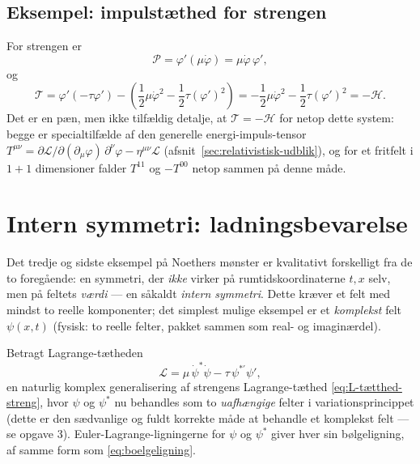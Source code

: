 \subsection{Eksempel: impulstæthed for strengen}

\begin{eksempel}
For strengen er
\begin{equation}
  \mathcal{P} = \varphi'(\mu\dot\varphi) = \mu\dot\varphi\,\varphi',
\end{equation}
og
\begin{equation}
  \mathcal{T} = \varphi'(-\tau\varphi') - \left(\frac12\mu\dot\varphi^2-\frac12\tau(\varphi')^2\right)
  = -\frac12\mu\dot\varphi^2 - \frac12\tau(\varphi')^2 = -\mathcal{H}.
\end{equation}
Det er en pæn, men ikke tilfældig detalje, at $\mathcal{T}=-\mathcal{H}$
for netop dette system: begge er specialtilfælde af den generelle
energi-impuls-tensor $T^{\mu\nu}=\partial\mathcal{L}/\partial(\partial_\mu\varphi)\,\partial^\nu\varphi-\eta^{\mu\nu}\mathcal{L}$
(afsnit~\ref{sec:relativistisk-udblik}), og for et fritfelt i $1+1$
dimensioner falder $T^{11}$ og $-T^{00}$ netop sammen på denne måde.
\end{eksempel}

\section{Intern symmetri: ladningsbevarelse}
\label{sec:ladning}

Det tredje og sidste eksempel på Noethers mønster er kvalitativt
forskelligt fra de to foregående: en symmetri, der \emph{ikke}
virker på rumtidskoordinaterne $t,x$ selv, men på feltets \emph{værdi}
— en såkaldt \emph{intern symmetri}. Dette kræver et felt med mindst
to reelle komponenter; det simplest mulige eksempel er et
\emph{komplekst} felt $\psi(x,t)$ (fysisk: to reelle felter, pakket
sammen som real- og imaginærdel).

Betragt Lagrange-tætheden
\begin{equation}
  \mathcal{L} = \mu\,\dot\psi^\ast\dot\psi - \tau\,\psi^{\ast\prime}\psi',
  \label{eq:L-komplekst-felt}
\end{equation}
en naturlig komplex generalisering af strengens Lagrange-tæthed
\eqref{eq:L-tætthed-streng}, hvor $\psi$ og $\psi^\ast$ nu behandles
som to \emph{uafhængige} felter i variationsprincippet (dette er den
sædvanlige og fuldt korrekte måde at behandle et komplekst felt — se
opgave 3). Euler-Lagrange-ligningerne for $\psi$ og $\psi^\ast$ giver
hver sin bølgeligning, af samme form som \eqref{eq:boelgeligning}.

